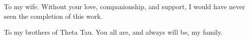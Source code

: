 \begin{dedication}
To my wife.  Without your love, companionship, and support, I would have never seen the completion of this work.

To my brothers of Theta Tau.  You all are, and always will be, my family.
\end{dedication}
